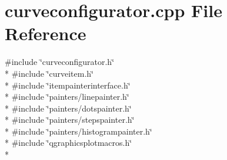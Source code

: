 \section{curveconfigurator.\+cpp File Reference}
\label{curveconfigurator_8cpp}
{\ttfamily \#include \char`\"{}curveconfigurator.\+h\char`\"{}}\\*
{\ttfamily \#include \char`\"{}curveitem.\+h\char`\"{}}\\*
{\ttfamily \#include \char`\"{}itempainterinterface.\+h\char`\"{}}\\*
{\ttfamily \#include \char`\"{}painters/linepainter.\+h\char`\"{}}\\*
{\ttfamily \#include \char`\"{}painters/dotspainter.\+h\char`\"{}}\\*
{\ttfamily \#include \char`\"{}painters/stepspainter.\+h\char`\"{}}\\*
{\ttfamily \#include \char`\"{}painters/histogrampainter.\+h\char`\"{}}\\*
{\ttfamily \#include \char`\"{}qgraphicsplotmacros.\+h\char`\"{}}\\*

